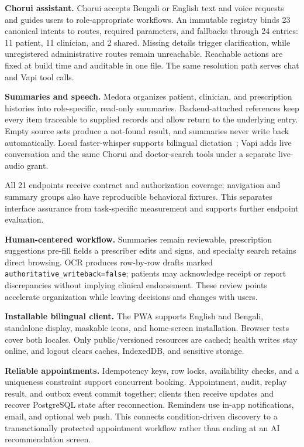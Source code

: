 \documentclass[preprint,12pt,a4paper]{elsarticle}
\begin{document}
\FloatBarrier

\textbf{Chorui assistant.} Chorui accepts Bengali or English text and voice requests and
guides users to role-appropriate workflows. An immutable registry binds 23 canonical
intents to routes, required parameters, and fallbacks through 24 entries: 11 patient, 11
clinician, and 2 shared. Missing details trigger clarification, while unregistered
administrative routes remain unreachable. Reachable actions are fixed at build time and
auditable in one file. The same resolution path serves chat and Vapi tool calls.

\textbf{Summaries and speech.} Medora organizes patient, clinician, and prescription
histories into role-specific, read-only summaries. Backend-attached references keep every
item traceable to supplied records and allow return to the underlying entry. Empty source
sets produce a not-found result, and summaries never write back automatically. Local
faster-whisper supports bilingual dictation~\cite{whisper}; Vapi adds live conversation and
the same Chorui and doctor-search tools under a separate live-audio grant.

All 21 endpoints receive contract and authorization coverage; navigation and summary groups
also have reproducible behavioral fixtures. This separates interface assurance from
task-specific measurement and supports further endpoint evaluation.

\textbf{Human-centered workflow.} Summaries remain reviewable, prescription suggestions
pre-fill fields a prescriber edits and signs, and specialty search retains direct browsing.
OCR produces row-by-row drafts marked \texttt{authoritative\_writeback=false}; patients may
acknowledge receipt or report discrepancies without implying clinical endorsement. These
review points accelerate organization while leaving decisions and changes with users.

\textbf{Installable bilingual client.} The PWA supports English and Bengali, standalone
display, maskable icons, and home-screen installation. Browser tests cover both locales.
Only public/versioned resources are cached; health writes stay online, and logout clears
caches, IndexedDB, and sensitive storage.

\textbf{Reliable appointments.} Idempotency keys, row locks, availability checks, and a
uniqueness constraint support concurrent booking. Appointment, audit, replay result, and
outbox event commit together; clients then receive updates and recover PostgreSQL state
after reconnection. Reminders use in-app notifications, email, and optional web push. This
connects condition-driven discovery to a transactionally protected appointment workflow
rather than ending at an AI recommendation screen.
\end{document}
